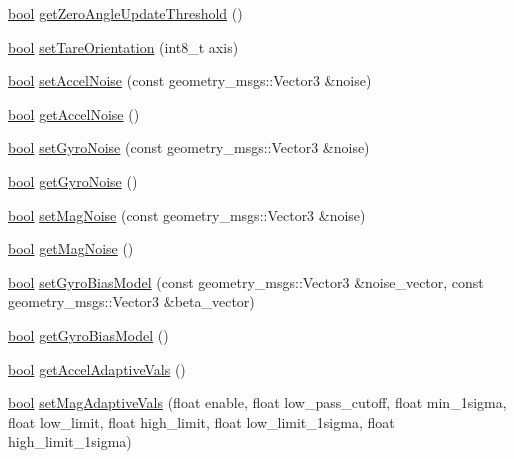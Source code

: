 \begin{DoxyCompactItemize}
\hyperlink{classbool}{bool} \hyperlink{classmicrostrain__mips__client_1_1ClMicrostainMips_a49a0db79d7d1790dc24b49a0493448ce}{get\+Zero\+Angle\+Update\+Threshold} ()
\item 
\hyperlink{classbool}{bool} \hyperlink{classmicrostrain__mips__client_1_1ClMicrostainMips_adb9790b8ff91d8df9650ba7ac31f4bc5}{set\+Tare\+Orientation} (int8\+\_\+t axis)
\item 
\hyperlink{classbool}{bool} \hyperlink{classmicrostrain__mips__client_1_1ClMicrostainMips_a303546d138e32bb523aa3aa80ef34d70}{set\+Accel\+Noise} (const geometry\+\_\+msgs\+::\+Vector3 \&noise)
\item 
\hyperlink{classbool}{bool} \hyperlink{classmicrostrain__mips__client_1_1ClMicrostainMips_a91a6566796afe3f3fcabc409535478f2}{get\+Accel\+Noise} ()
\item 
\hyperlink{classbool}{bool} \hyperlink{classmicrostrain__mips__client_1_1ClMicrostainMips_ae468f55c6725f7fa2fa8777cb41eaa34}{set\+Gyro\+Noise} (const geometry\+\_\+msgs\+::\+Vector3 \&noise)
\item 
\hyperlink{classbool}{bool} \hyperlink{classmicrostrain__mips__client_1_1ClMicrostainMips_a628a42bfa5c047e4a718a7e4c68422c3}{get\+Gyro\+Noise} ()
\item 
\hyperlink{classbool}{bool} \hyperlink{classmicrostrain__mips__client_1_1ClMicrostainMips_afa4536159f14d7c6df054b3befe5e258}{set\+Mag\+Noise} (const geometry\+\_\+msgs\+::\+Vector3 \&noise)
\item 
\hyperlink{classbool}{bool} \hyperlink{classmicrostrain__mips__client_1_1ClMicrostainMips_ad8433e7aa2ed4dea2bf69c83d57e5e45}{get\+Mag\+Noise} ()
\item 
\hyperlink{classbool}{bool} \hyperlink{classmicrostrain__mips__client_1_1ClMicrostainMips_aa19331d65cf8f5042c746985cd505a38}{set\+Gyro\+Bias\+Model} (const geometry\+\_\+msgs\+::\+Vector3 \&noise\+\_\+vector, const geometry\+\_\+msgs\+::\+Vector3 \&beta\+\_\+vector)
\item 
\hyperlink{classbool}{bool} \hyperlink{classmicrostrain__mips__client_1_1ClMicrostainMips_ab188b8307aa2beb016809873a0c55d07}{get\+Gyro\+Bias\+Model} ()
\item 
\hyperlink{classbool}{bool} \hyperlink{classmicrostrain__mips__client_1_1ClMicrostainMips_a29413fde4bc81d0a61ae9b7dba692182}{get\+Accel\+Adaptive\+Vals} ()
\item 
\hyperlink{classbool}{bool} \hyperlink{classmicrostrain__mips__client_1_1ClMicrostainMips_abca0864a38d13f7162a481b4d80f207c}{set\+Mag\+Adaptive\+Vals} (float enable, float low\+\_\+pass\+\_\+cutoff, float min\+\_\+1sigma, float low\+\_\+limit, float high\+\_\+limit, float low\+\_\+limit\+\_\+1sigma, float high\+\_\+limit\+\_\+1sigma)

\end{DoxyCompactItemize}
